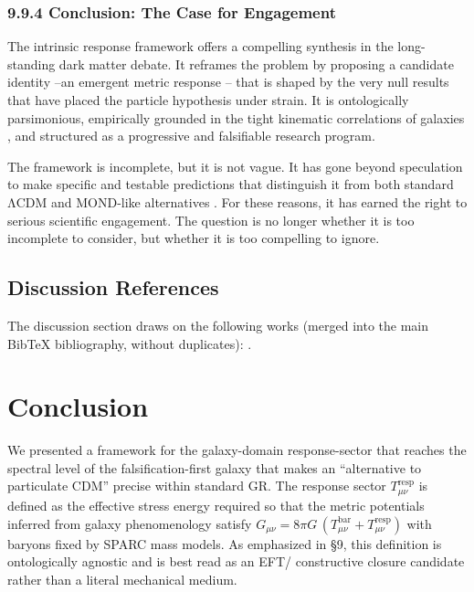 \documentclass[11pt]{article}
\begin{document}
\subsubsection{9.9.4 Conclusion: The Case for Engagement}\label{conclusion-the-case-for-engagement}

The intrinsic response framework offers a compelling synthesis in the long-standing dark matter debate. It reframes the problem by proposing a candidate identity --an emergent metric response -- that is shaped by the very null results that have placed the particle hypothesis under strain. It is ontologically parsimonious, empirically grounded in the tight kinematic correlations of galaxies \citep{McGaugh2016RAR}, and structured as a progressive and falsifiable research program.

The framework is incomplete, but it is not vague. It has gone beyond speculation to make specific and testable predictions that distinguish it from both standard ΛCDM and MOND-like alternatives \citep{BullockBoylanKolchin2017SmallScale,Verlinde2017Emergent}. For these reasons, it has earned the right to serious scientific engagement. The question is no longer whether it is too incomplete to consider, but whether it is too compelling to ignore.

\subsection{Discussion References}\label{discussion-references}

The discussion section draws on the following works (merged into the main BibTeX bibliography, without duplicates):
\citep{Planck2018CosmoParams,Kuhn1962Revolutions,UndagoitiaRauch2016DirectDetection,LZ2023FirstResults,Milgrom1983MOND,Bekenstein2004TeVeS,Clowe2006Bullet,Lakatos1978Methodology,Lelli2016SPARC,Bardeen1980GaugeInvariant,McGaugh2016RAR,BullockBoylanKolchin2017SmallScale,Verlinde2017Emergent}.


\section{Conclusion}\label{conclusion}

We presented a framework for the galaxy-domain response-sector that reaches the spectral level of the falsification-first galaxy that makes an ``alternative to particulate CDM'' precise within standard GR. The response sector \(T_{\mu\nu}^{\text{resp}}\) is defined as the effective stress energy required so that the metric potentials inferred from galaxy phenomenology satisfy \(G_{\mu\nu} = 8\pi G\,\left( T_{\mu\nu}^{\text{bar}} + T_{\mu\nu}^{\text{resp}} \right)\) with baryons fixed by SPARC mass models. As emphasized in §9, this definition is ontologically agnostic and is best read as an EFT/ constructive closure candidate rather than a literal mechanical medium.
\end{document}

